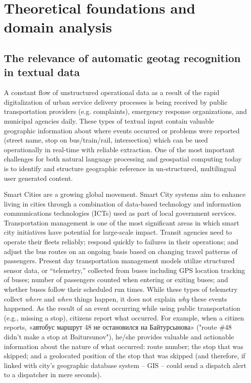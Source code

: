 %
%

\chapter{Theoretical foundations and domain analysis}
\label{chap:theory}

\section{The relevance of automatic geotag recognition in textual data}
\label{sec:relevance}

A constant flow of unstructured operational data as a result of the rapid digitalization of urban service delivery processes is being received by public transportation providers (e.g. complaints), emergency response organizations, and municipal agencies daily. These types of textual input contain valuable geographic information about where events occurred or problems were reported (street name, stop on bus/train/rail, intersection) which can be used operationally in real-time with reliable extraction. One of the most important challenges for both natural language processing and geospatial computing today is to identify and structure geographic reference in un-structured, multilingual user generated content.

Smart Cities are a growing global movement. Smart City systems aim to enhance living in cities through a combination of data-based technology and information communications technologies (ICTs) used as part of local government services. Transportation management is one of the most significant areas in which smart city initiatives have potential for large-scale impact. Transit agencies need to operate their fleets reliably; respond quickly to failures in their operations; and adjust the bus routes on an ongoing basis based on changing travel patterns of passengers. Present day transportation management models utilize structured sensor data, or “telemetry,” collected from buses including GPS location tracking of buses; number of passengers counted when entering or exiting buses; and whether buses follow their scheduled run times. While these types of telemetry collect \textit{where} and \textit{when} things happen, it does not explain \textit{why} these events happened. As the result of an event occurring while using public transportation (e.g., missing a stop), citizens report what occurred. For example, when a citizen reports, \foreignlanguage{russian}{«автобус маршрут 48 не остановился на Байтурсынова»} ("route \#48 didn't make a stop at Baitursunov"), he/she provides valuable and actionable information about the nature of what occurred: route number; the stop that was skipped; and a geolocated position of the stop that was skipped (and therefore, if linked with city's geographic database system – GIS – could send a dispatch alert to a dispatcher in mere seconds). 

